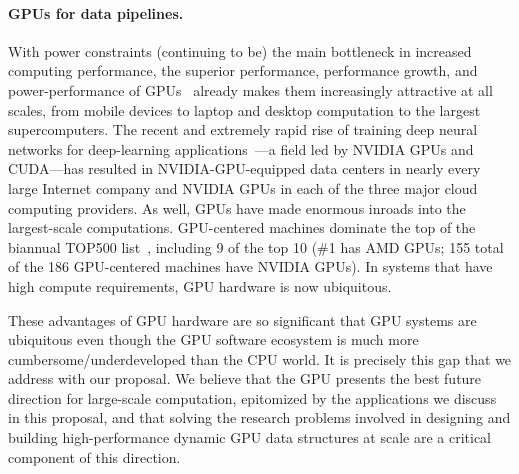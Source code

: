 \paragraph{GPUs for data pipelines.} With power constraints (continuing to be) the main bottleneck in increased
computing performance, the superior performance, performance growth, and
power-performance of GPUs~\cite{Dally:2010:GCT,Dally:2021:EOT} already makes
them increasingly attractive at all scales, from mobile devices to laptop and
desktop computation to the largest supercomputers. The recent and extremely
rapid rise of training deep neural networks for deep-learning
applications~\cite{Amodei:2015:DS2,Chetlur:2014:CEP,Coates:2013:DLW,Hannun:2014:DSU}---a
field led by NVIDIA GPUs and CUDA---has resulted in NVIDIA-GPU-equipped data
centers in nearly every large Internet company and NVIDIA GPUs in each of the
three major cloud computing providers. As well, GPUs have made enormous inroads
into the largest-scale computations. GPU-centered machines dominate the top of
the biannual TOP500 list~\cite{top500:jun2024}, including 9 of the top 10 (\#1
has AMD GPUs; 155 total of the 186 GPU-centered machines have NVIDIA GPUs). In
systems that have high compute requirements, GPU hardware is now ubiquitous.
%
%

These advantages of GPU hardware are so significant that GPU systems are
ubiquitous even though the GPU software ecosystem is much more
cumbersome/underdeveloped than the CPU world. It is precisely this gap that we
address with our proposal. We believe that the GPU presents the best future
direction for large-scale computation, epitomized by the applications we
discuss in this proposal, and that solving the research problems involved in
designing and building high-performance dynamic GPU data structures at scale
are a critical component of this direction.



